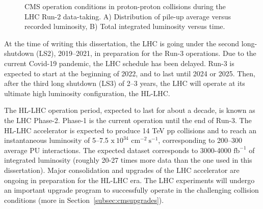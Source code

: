 \begin{figure}[htp!]
\centering
\captionsetup[subfigure]{justification=centering}
\caption[CMS operation conditions in proton-proton collisions during the LHC Run-2 data-taking]{CMS operation conditions in proton-proton collisions during the LHC Run-2 data-taking. A) Distribution of pile-up average versus recorded luminosity, B) Total integrated luminosity versus time.}
\label{fig:cmspileuprun2}
\end{figure}

At the time of writing this dissertation, the LHC is going under the second long-shutdown (LS2), 2019--2021, in preparation for the Run-3 operations. Due to the current Covid-19 pandemic, the LHC schedule has been delayed. Run-3 is expected to start at the beginning of 2022, and to last until 2024 or 2025. Then, after the third long shutdown (LS3) of 2--3 years, the LHC will operate at its ultimate high luminosity configuration, the HL-LHC. 

The HL-LHC operation period, expected to last for about a decade, is known as the LHC Phase-2. Phase-1 is the current operation until the end of Run-3. The HL-LHC accelerator is expected to produce 14 TeV pp collisions and to reach an instantaneous luminosity of 5--7.5 $\mathrm{x~10^{34}}$ $\mathrm{cm^{-2}~s^{-1}}$, corresponding to 200--300 average PU interactions. The expected dataset corresponds to 3000-4000 $\mathrm{fb^{-1}}$ of integrated luminosity (roughly 20-27 times more data than the one used in this dissertation). Major consolidation and upgrades of the LHC accelerator are ongoing in preparation for the HL-LHC era. The LHC experiments will undergo an important upgrade program to successfully operate in the challenging collision conditions (more in Section~\ref{subsec:cmsupgrades}).

